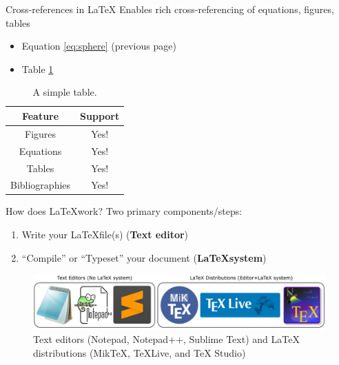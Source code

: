 \documentclass{beamer}
\begin{document}
{  \begin{frame}{Cross-references in \LaTeX}
    Enables rich cross-referencing of equations, figures, tables
    \begin{itemize}
      \item Equation \ref{eq:sphere} (previous page)
      \item Table \ref{tab:ex-table} 
    \end{itemize}
    \begin{table}
      \centering
      \begin{tabular}{c|c}
        \textbf{Feature} & \textbf{Support} \\ \hline
        Figures & Yes! \\ \hline
        Equations & Yes! \\ \hline
        Tables & Yes! \\ \hline
        Bibliographies & Yes! \\ 
      \end{tabular}
      \caption{A simple table.}
      \label{tab:ex-table}
    \end{table}
  \end{frame}

  \begin{frame}{How does \LaTeX work?}
    Two primary components/steps:
    \begin{enumerate}
      \item Write your \LaTeX file(s) (\textbf{Text editor})
      \item ``Compile'' or ``Typeset'' your document (\textbf{\LaTeX \;system})
    \end{enumerate}
    \vspace{0.125in}
    \begin{figure}
      \includegraphics[width=0.8\linewidth]{tex_systems.png}
      \caption{Text editors (Notepad, Notepad++, Sublime Text) and LaTeX distributions (MikTeX, TeXLive, and TeX Studio)}
      \label{fig:systems}
    \end{figure}
  \end{frame}

}
\end{document}
